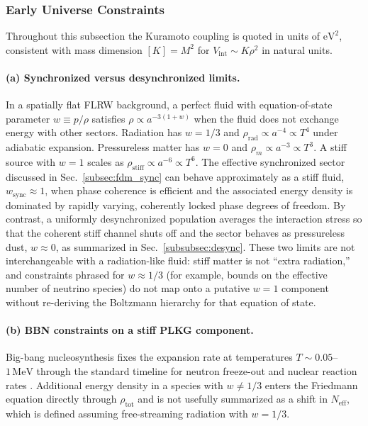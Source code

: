 \subsubsection{Early Universe Constraints}
\label{subsubsec:early-universe}

Throughout this subsection the Kuramoto coupling is quoted in units of $\mathrm{eV}^2$, consistent with mass dimension $[K]=M^2$ for $V_{\mathrm{int}}\sim K\rho^2$ in natural units.

\paragraph{(a) Synchronized versus desynchronized limits.}
In a spatially flat FLRW background, a perfect fluid with equation-of-state parameter $w\equiv p/\rho$ satisfies $\rho\propto a^{-3(1+w)}$ when the fluid does not exchange energy with other sectors.
Radiation has $w=1/3$ and $\rho_{\mathrm{rad}}\propto a^{-4}\propto T^4$ under adiabatic expansion.
Pressureless matter has $w=0$ and $\rho_{m}\propto a^{-3}\propto T^3$.
A stiff source with $w=1$ scales as $\rho_{\mathrm{stiff}}\propto a^{-6}\propto T^6$.
The effective synchronized sector discussed in Sec.~\ref{subsec:fdm_sync} can behave approximately as a stiff fluid, $w_{\mathrm{sync}}\approx 1$, when phase coherence is efficient and the associated energy density is dominated by rapidly varying, coherently locked phase degrees of freedom.
By contrast, a uniformly desynchronized population averages the interaction stress so that the coherent stiff channel shuts off and the sector behaves as pressureless dust, $w\approx 0$, as summarized in Sec.~\ref{subsubsec:desync}.
These two limits are not interchangeable with a radiation-like fluid: stiff matter is not ``extra radiation,'' and constraints phrased for $w\approx 1/3$ (for example, bounds on the effective number of neutrino species) do not map onto a putative $w=1$ component without re-deriving the Boltzmann hierarchy for that equation of state.

\paragraph{(b) BBN constraints on a stiff PLKG component.}
Big-bang nucleosynthesis fixes the expansion rate at temperatures $T\sim 0.05$--$1\,\mathrm{MeV}$ through the standard timeline for neutron freeze-out and nuclear reaction rates \cite{Cyburt2016}.
Additional energy density in a species with $w\neq 1/3$ enters the Friedmann equation directly through $\rho_{\mathrm{tot}}$ and is not usefully summarized as a shift in $N_{\mathrm{eff}}$, which is defined assuming free-streaming radiation with $w=1/3$.

